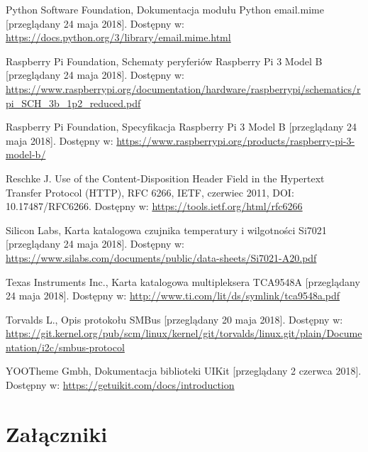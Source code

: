 \documentclass[a4paper,11pt,twoside]{article}
\begin{document}
\begin{thebibliography}{9}
Python Software Foundation, Dokumentacja modułu Python email.mime [przeglądany 24 maja 2018].
Dostępny w: \url{https://docs.python.org/3/library/email.mime.html}

Raspberry Pi Foundation, Schematy peryferiów Raspberry Pi 3 Model B [przeglądany 24 maja 2018].
Dostępny w: \url{https://www.raspberrypi.org/documentation/hardware/raspberrypi/schematics/rpi_SCH_3b_1p2_reduced.pdf}

Raspberry Pi Foundation, Specyfikacja Raspberry Pi 3 Model B [przeglądany 24 maja 2018].
Dostępny w: \url{https://www.raspberrypi.org/products/raspberry-pi-3-model-b/}

Reschke J. Use of the Content-Disposition Header Field in the Hypertext Transfer Protocol (HTTP), RFC 6266, IETF, czerwiec 2011, DOI: 10.17487/RFC6266.
Dostępny w: \url{https://tools.ietf.org/html/rfc6266}

Silicon Labs, Karta katalogowa czujnika temperatury i wilgotności Si7021 [przeglądany 24 maja 2018].
Dostępny w: \url{https://www.silabs.com/documents/public/data-sheets/Si7021-A20.pdf}

Texas Instruments Inc., Karta katalogowa multipleksera TCA9548A [przeglądany 24 maja 2018].
Dostępny w: \url{http://www.ti.com/lit/ds/symlink/tca9548a.pdf}

Torvalds L., Opis protokołu SMBus [przeglądany 20 maja 2018].
Dostępny w: \url{https://git.kernel.org/pub/scm/linux/kernel/git/torvalds/linux.git/plain/Documentation/i2c/smbus-protocol}

YOOTheme Gmbh, Dokumentacja biblioteki UIKit [przeglądany 2 czerwca 2018].
Dostępny w: \url{https://getuikit.com/docs/introduction}

\end{thebibliography}

\newpage
\section{Załączniki}
\end{document}
